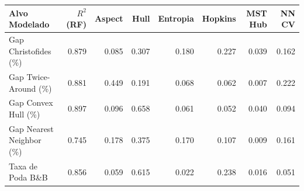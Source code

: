 \begin{tabular}{lrrrrrrr}
\hline
\textbf{Alvo Modelado} & $R^2$ (RF) & \textbf{Aspect} & \textbf{Hull} & \textbf{Entropia} & \textbf{Hopkins} & \textbf{MST Hub} & \textbf{NN CV} \\
\hline
Gap Christofides (\%) & 0.879 & 0.085 & 0.307 & 0.180 & 0.227 & 0.039 & 0.162 \\
Gap Twice-Around (\%) & 0.881 & 0.449 & 0.191 & 0.068 & 0.062 & 0.007 & 0.222 \\
Gap Convex Hull (\%) & 0.897 & 0.096 & 0.658 & 0.061 & 0.052 & 0.040 & 0.094 \\
Gap Nearest Neighbor (\%) & 0.745 & 0.178 & 0.375 & 0.170 & 0.107 & 0.009 & 0.161 \\
Taxa de Poda B\&B & 0.856 & 0.059 & 0.615 & 0.022 & 0.238 & 0.016 & 0.051 \\
\hline
\end{tabular}
